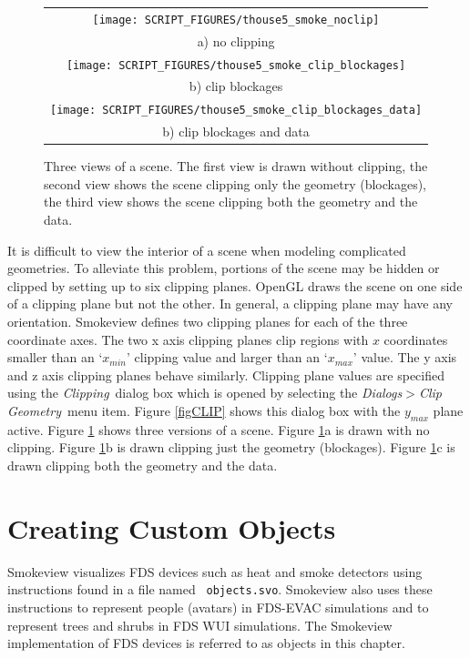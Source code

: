 \documentclass[11pt,twoside]{book}
\begin{document}
\begin{figure}[\figoptions]
\begin{center}
\begin{tabular}{c}
\texttt{[image: SCRIPT\_FIGURES/thouse5\_smoke\_noclip]}\\
a) no clipping\\
\texttt{[image: SCRIPT\_FIGURES/thouse5\_smoke\_clip\_blockages]}\\
b) clip blockages\\
\texttt{[image: SCRIPT\_FIGURES/thouse5\_smoke\_clip\_blockages\_data]}\\
b) clip blockages and data\\
\end{tabular}
\end{center}
\caption[Clipping a scene.]{Three views of a scene. The first view
is drawn without clipping, the second view shows the scene
clipping only the geometry (blockages), the third view shows the
scene clipping both the geometry and the data.} \label{figCLIPPED}
\end{figure}

It is difficult to view the interior of a scene when modeling
complicated geometries.  To alleviate this problem, portions of
the scene may be hidden or clipped by setting up to six clipping
planes. OpenGL draws the scene on one side of a clipping plane but
not the other. In general, a clipping plane may have any
orientation. Smokeview defines two clipping planes for each of the
three coordinate axes.   The two x axis clipping planes clip
regions with $x$ coordinates smaller than an `$x_{min}$' clipping
value and larger than an `$x_{max}$' value. The y axis and z axis
clipping planes behave similarly.  Clipping plane values are
specified using the {\em Clipping}\ dialog box which is opened by
selecting the {\em Dialogs$>$Clip Geometry}\ menu item. Figure
\ref{figCLIP} shows this dialog box with the $y_{max}$ plane
active. Figure \ref{figCLIPPED} shows three versions of a scene.
Figure \ref{figCLIPPED}a is drawn with no clipping. Figure
\ref{figCLIPPED}b is drawn clipping just the geometry (blockages).
Figure \ref{figCLIPPED}c is drawn clipping both the geometry and
the data.


\chapter{Creating Custom Objects}
\label{chap:devices} Smokeview visualizes FDS devices such as heat
and smoke detectors using instructions found in a file named {\tt
objects.svo}. Smokeview also uses these instructions to represent
people (avatars) in FDS-EVAC simulations and to represent trees
and shrubs in FDS WUI simulations. The Smokeview implementation of
FDS devices is referred to as objects in this chapter.
\end{document}

